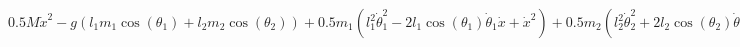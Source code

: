 \documentclass[preview]{standalone}
\begin{document}
\centering $0.5 M \dot{x}^{2} - g \left(l_{1} m_{1} \operatorname{cos}\left(\theta_{1}\right) + l_{2} m_{2} \operatorname{cos}\left(\theta_{2}\right)\right) + 0.5 m_{1} \left(l_{1}^{2} \dot{\theta}_{1}^{2} - 2 l_{1} \operatorname{cos}\left(\theta_{1}\right) \dot{\theta}_{1} \dot{x} + \dot{x}^{2}\right) + 0.5 m_{2} \left(l_{2}^{2} \dot{\theta}_{2}^{2} + 2 l_{2} \operatorname{cos}\left(\theta_{2}\right) \dot{\theta}_{2} \dot{x} + \dot{x}^{2}\right)$
\end{document}
